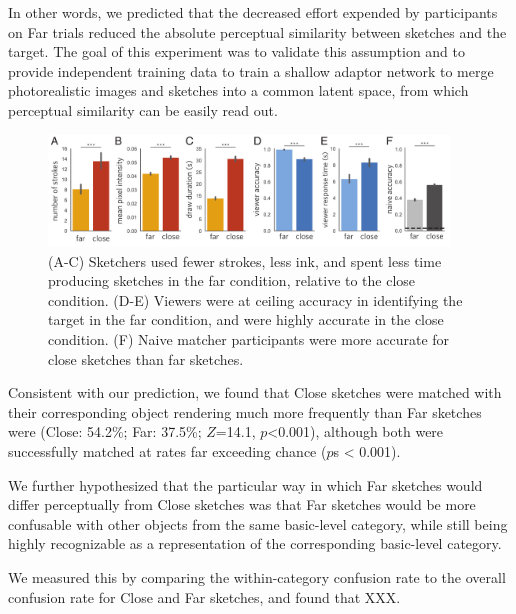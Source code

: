\documentclass[9pt,twocolumn,twoside]{pnas-new}
\begin{document}
In other words, we predicted that the decreased effort expended by participants on Far trials reduced the absolute perceptual similarity between sketches and the target. The goal of this experiment was to validate this assumption and to provide independent training data to train a shallow adaptor network to merge photorealistic images and sketches into a common latent space, from which perceptual similarity can be easily read out.


\begin{figure}[htbp]
\centering
\includegraphics[width=0.95\textwidth]{figures/3_behavioral_performance.pdf}
\caption{(A-C) Sketchers used fewer strokes, less ink, and spent less time producing sketches in the far condition, relative to the close condition. (D-E) Viewers were at ceiling accuracy in identifying the target in the far condition, and were highly accurate in the close condition. (F) Naive matcher participants were more accurate for close sketches than far sketches.}
\label{task_performance}
\end{figure}



Consistent with our prediction, we found that Close sketches were matched with their corresponding object rendering much more frequently than Far sketches were (Close: 54.2\%; Far: 37.5\%; $Z$=14.1, $p$<0.001), although both were successfully matched at rates far exceeding chance ($p$s < 0.001).



We further hypothesized that the particular way in which Far sketches would differ perceptually from Close sketches was that Far sketches would be more confusable with other objects from the same basic-level category, while still being highly recognizable as a representation of the corresponding basic-level category.

We measured this by comparing the within-category confusion rate to the overall confusion rate for Close and Far sketches, and found that XXX.
\end{document}
